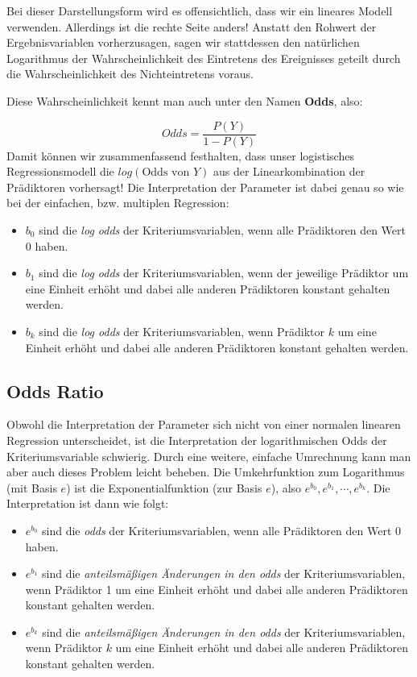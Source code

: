 \documentclass[
]{article}
\providecommand{\tightlist}{%
  \setlength{\itemsep}{0pt}\setlength{\parskip}{0pt}}
\begin{document}
Bei dieser Darstellungsform wird es offensichtlich, dass wir ein lineares Modell verwenden. Allerdings ist die rechte Seite anders! Anstatt den Rohwert der Ergebnisvariablen vorherzusagen, sagen wir stattdessen den natürlichen Logarithmus der Wahrscheinlichkeit des Eintretens des Ereignisses geteilt durch die Wahrscheinlichkeit des Nichteintretens voraus.

Diese Wahrscheinlichkeit kennt man auch unter den Namen \textbf{Odds}, also:

\[Odds = \frac{P(Y)}{1-P(Y)}\]
Damit können wir zusammenfassend festhalten, dass unser logistisches Regressionsmodell die \(log(\text{Odds von } Y)\) aus der Linearkombination der Prädiktoren vorhersagt! Die Interpretation der Parameter ist dabei genau so wie bei der einfachen, bzw. multiplen Regression:

\begin{itemize}
\tightlist
\item
  \(b_0\) sind die \emph{log odds} der Kriteriumsvariablen, wenn alle Prädiktoren den Wert 0 haben.
\item
  \(b_1\) sind die \emph{log odds} der Kriteriumsvariablen, wenn der jeweilige Prädiktor um eine Einheit erhöht und dabei alle anderen Prädiktoren konstant gehalten werden.
\item
  \(b_k\) sind die \emph{log odds} der Kriteriumsvariablen, wenn Prädiktor \(k\) um eine Einheit erhöht und dabei alle anderen Prädiktoren konstant gehalten werden.
\end{itemize}

\subsection{Odds Ratio}\label{odds-ratio}

Obwohl die Interpretation der Parameter sich nicht von einer normalen linearen Regression unterscheidet, ist die Interpretation der logarithmischen Odds der Kriteriumsvariable schwierig. Durch eine weitere, einfache Umrechnung kann man aber auch dieses Problem leicht beheben. Die Umkehrfunktion zum Logarithmus (mit Basis \(e\)) ist die Exponentialfunktion (zur Basis \(e\)), also \(e^{b_0}, e^{b_1}, \cdots, e^{b_k}\). Die Interpretation ist dann wie folgt:

\begin{itemize}
\tightlist
\item
  \(e^{b_0}\) sind die \emph{odds} der Kriteriumsvariablen, wenn alle Prädiktoren den Wert 0 haben.
\item
  \(e^{b_1}\) sind die \emph{anteilsmäßigen Änderungen in den odds} der Kriteriumsvariablen, wenn Prädiktor 1 um eine Einheit erhöht und dabei alle anderen Prädiktoren konstant gehalten werden.
\item
  \(e^{b_k}\) sind die \emph{anteilsmäßigen Änderungen in den odds} der Kriteriumsvariablen, wenn Prädiktor \(k\) um eine Einheit erhöht und dabei alle anderen Prädiktoren konstant gehalten werden.
\end{itemize}
\end{document}
